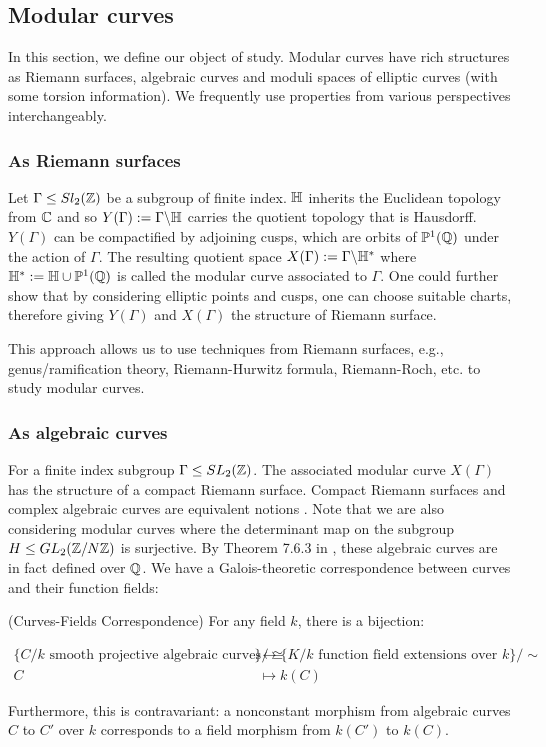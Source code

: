
\subsection{Modular curves}
In this section, we define our object of study. Modular curves have rich structures as Riemann surfaces, algebraic curves and moduli spaces of elliptic curves (with some torsion information). We frequently use properties from various perspectives interchangeably.

\subsubsection{As Riemann surfaces}
Let $\Gamma \leq Sl_2(\mathbb{Z})$ be a subgroup of finite index. $\mathbb{H}$ inherits the Euclidean topology from $\mathbb{C}$ and so $Y(\Gamma) := \Gamma \backslash \mathbb{H}$ carries the quotient topology that is Hausdorff. $Y(\Gamma)$ can be compactified by adjoining cusps, which are orbits of $\mathbb{P}^1(\mathbb{Q})$ under the action of $\Gamma$. The resulting quotient space $X(\Gamma) := \Gamma \backslash \mathbb{H}^*$ where $\mathbb{H}^* := \mathbb{H} \cup \mathbb{P}^1(\mathbb{Q})$ is called the modular curve associated to $\Gamma$. One could further show that by considering elliptic points and cusps, one can choose suitable charts, therefore giving $Y(\Gamma)$ and $X(\Gamma)$ the structure of Riemann surface.

This approach allows us to use techniques from Riemann surfaces, e.g., genus/ramification theory, Riemann-Hurwitz formula, Riemann-Roch, etc. to study modular curves.

\subsubsection{As algebraic curves}

For a finite index subgroup $\Gamma \leq SL_2(\mathbb{Z})$. The associated modular curve $X(\Gamma)$ has the structure of a compact Riemann surface. Compact Riemann surfaces and complex algebraic curves are equivalent notions \cite{forster}. Note that we are also considering modular curves where the determinant map on the subgroup $H \leq GL_2(\mathbb{Z}/N\mathbb{Z})$ is surjective. By Theorem 7.6.3 in \cite{Shurman}, these algebraic curves are in fact defined over $\mathbb{Q}$. We have a Galois-theoretic correspondence between curves and their function fields:

\begin{theorem}{(Curves-Fields Correspondence)} For any field $k$, there is a bijection:

\begin{align*}
\{\text{$C/k$ smooth projective algebraic curves}\}/\cong &\leftrightarrow \{\text{$K/k$ function field extensions over $k$}\}/\sim \\
C &\mapsto k(C)
\end{align*}

Furthermore, this is contravariant: a nonconstant morphism from  algebraic curves $C$ to $C'$ over $k$ corresponds to a field morphism from $k(C')$ to $k(C)$.

\end{theorem}

